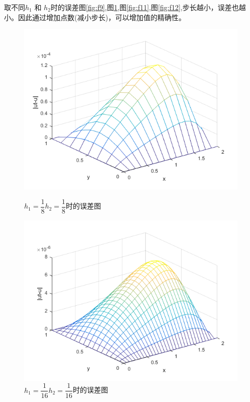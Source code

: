 \documentclass[withoutpreface,bwprint]{cumcmthesis} %
\begin{document}
取不同$h_1$ 和 $h_2$时的误差图\ref{fig:f9},图\ref{fig:f10},图\ref{fig:f11},图\ref{fig:f12},步长越小，误差也越小。因此通过增加点数(减小步长)，可以增加值的精确性。
\begin{figure}[htbp]
	\begin{minipage}[htbp]{0.5\linewidth}
		\centering
		\includegraphics[width=1\linewidth]{figures/f9}
		\caption{$h_1=\dfrac{1}{8}$\quad$h_2=\dfrac{1}{8}$时的误差图}
		\label{fig:f9}
	\end{minipage}
	\begin{minipage}[htbp]{0.5\linewidth}
		\centering
		\includegraphics[width=1\linewidth]{figures/f10}
		\caption{$h_1=\dfrac{1}{16}$\quad$h_2=\dfrac{1}{16}$时的误差图}
		\label{fig:f10}
	\end{minipage}

\end{figure}
\end{document}
